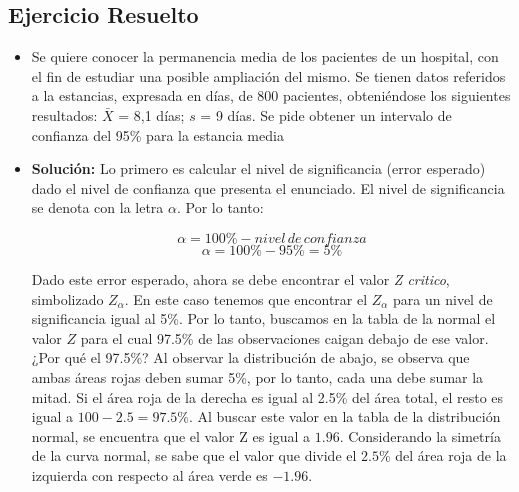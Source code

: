 \documentclass[letterpaper]{article}
\begin{document}
\subsection{Ejercicio Resuelto}
\begin{itemize}
	\item Se quiere conocer la permanencia media de los pacientes de un hospital, con el fin de estudiar una posible ampliación del mismo. Se tienen datos referidos a la estancias, expresada en días, de 800 pacientes, obteniéndose los siguientes resultados: $\bar{X}$ = 8,1 días; $s$ = 9 días. Se
	pide obtener un intervalo de confianza del 95\% para la estancia media
	
	
	\item {\bf Solución:} Lo primero es calcular el nivel de significancia (error esperado) dado el nivel de confianza que presenta el enunciado. El nivel de significancia se denota con la letra $\alpha$. Por lo tanto:
	
	$$\alpha=100\% - nivel \, de\, confianza$$
	$$\alpha=100\%-95\%=5\%$$
	
	Dado este error esperado, ahora se debe encontrar el valor \emph{Z critico}, simbolizado $Z_{\alpha}$. En este caso tenemos que encontrar el $Z_{\alpha}$ para un nivel de significancia igual al 5\%. Por lo tanto, buscamos en la tabla de la normal el valor $Z$ para el cual 97.5\% de las observaciones caigan debajo de ese valor. ¿Por qué el 97.5\%? Al observar la distribución de abajo, se observa que ambas áreas rojas deben sumar 5\%, por lo tanto, cada una debe sumar la mitad. Si el área roja de la derecha es igual al 2.5\% del área total, el resto es igual a $100-2.5=97.5\%$. Al buscar este valor en la tabla de la distribución normal, se encuentra que el valor Z es igual a $1.96$. Considerando la simetría de la curva normal, se sabe que el valor que divide el $2.5\%$ del área roja de la izquierda con respecto al área verde es $-1.96$.
	
	\begin{center}
		
\end{center}
\end{itemize}
\end{document}
